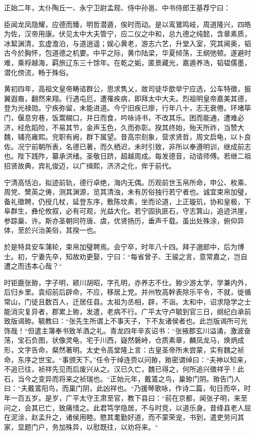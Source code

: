 \documentclass[12pt,UTF8]{ctexbook}
\begin{document}
正始二年，太仆陶丘一、永宁卫尉孟观、侍中孙邕、中书侍郎王基荐宁曰：

臣闻龙凤隐耀，应德而臻，明哲潜遁，俟时而动。是以鸾鷟鸣岐，周道隆兴，四皓为佐，汉帝用康。伏见太中大夫管宁，应二仪之中和，总九德之纯懿，含章素质，冰絜渊清，玄虚澹泊，与道逍遥；娱心黄老，游志六艺，升堂入室，究其阃奥，韬古今於胸怀，包道德之机要。中平之际，黄巾陆梁，华夏倾荡，王纲弛顿。遂避时难，乘桴越海，羁旅辽东三十馀年。在乾之姤，匿景藏光，嘉遁养浩，韬韫儒墨，潜化傍流，畅于殊俗。

黄初四年，高祖文皇帝畴谘群公，思求隽乂，故司徒华歆举宁应选，公车特徵，振翼遐裔，翻然来翔。行遇屯厄，遭罹疾病，即拜太中大夫。烈祖明皇帝嘉美其德，登为光禄勋。宁疾弥留，未能进道。今宁旧疾已瘳，行年八十，志无衰倦。环堵筚门，偃息穷巷，饭鬻糊口，并日而食，吟咏诗书，不改其乐。困而能通，遭难必济，经危蹈险，不易其节，金声玉色，久而弥彰。揆其终始，殆天所祚，当赞大魏，辅亮雍熙。兖职有阙，群下属望。昔高宗刻象，营求贤哲，周文启龟，以卜良佐。况宁前朝所表，名德已著，而久栖迟，未时引致，非所以奉遵明训，继成前志也。陛下践阼，纂承洪绪。圣敬日跻，超越周成。每发德音，动谘师傅。若继二祖招贤故典，宾礼俊迈，以广缉熙，济济之化，侔于前代。

宁清高恬泊，拟迹前轨，德行卓绝，海内无偶。历观前世玉帛所命，申公、枚乘、周党、樊英之俦，测其渊源，览其清浊，未有厉俗独行若宁者也。诚宜束帛加璧，备礼徵聘，仍授几杖，延登东序，敷陈坟素，坐而论道，上正璇玑，协和皇极，下阜群生，彝伦攸叙，必有可观，光益大化。若宁固执匪石，守志箕山，追迹洪崖，参踪巢、许。斯亦圣朝同符唐、虞，优贤扬历，垂声千载。虽出处殊涂，俯仰异体，至於兴治美俗，其揆一也。

於是特具安车蒲轮，束帛加璧聘焉。会宁卒，时年八十四。拜子邈郎中，后为博士。初，宁妻先卒，知故劝更娶，宁曰：“每省曾子、王骏之言，意常嘉之，岂自遭之而违本心哉？“

时钜鹿张臶，字子明，颍川胡昭，字孔明，亦养志不仕。臶少游太学，学兼内外，后归乡里。袁绍前后辟命，不应，移居上党。并州牧高幹表除乐平令，不就，徙循常山，门徒且数百人，迁居任县。太祖为丞相，辟，不诣。太和中，诏求隐学之士能消灾复异者，郡累上臶，发遣，老病不行。广平太守卢毓到官三日，纲纪白承前致版谒臶。毓教曰：“张先生所谓上不事天子，下不友诸侯者也。此岂版谒所可光饰哉！“但遣主簿奉书致羊酒之礼。青龙四年辛亥诏书：“张掖郡玄川溢涌，激波奋荡，宝石负图，状像灵龟，宅于川西，嶷然磐峙，仓质素章，麟凤龙马，焕炳成形，文字告命，粲然著明。太史令高堂隆上言：古皇圣帝所未尝蒙，实有魏之祯命，东序之世宝。“事颁天下。”任令于绰连赍以问臶，臶密谓绰曰：“夫神以知来，不追已往，祯祥先见而后废兴从之。汉已久亡，魏已得之，何所追兴徵祥乎！此石，当今之变异而将来之祯瑞也。“正始元年，戴鵀之鸟，巢臶门阴。臶告门人曰：“夫戴鵀阳鸟，而巢门阴，此凶祥也。“乃援琴歌咏，作诗二篇，旬日而卒，时年一百五岁。是岁，广平太守王肃至官，教下县曰：“前在京都，闻张子明，来至问之，会其已亡，致痛惜之。此君笃学隐居，不与时竞，以道乐身。昔绛县老人屈在泥涂，赵孟升之，诸侯用睦。愍其耄勤好道，而不蒙荣宠，书到，遣吏劳问其家，显题门户，务加殊异，以慰既往，以劝将来。“
\end{document}
